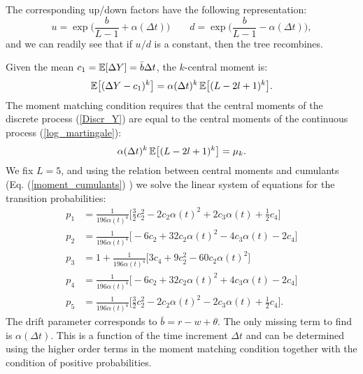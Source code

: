 The corresponding up/down factors have the following representation:
\begin{equation}\label{updown}
 u = \exp\biggl( \frac{b}{L-1} + \alpha(\Delta t) \biggr) \hspace{2em}  d = \exp\biggl( \frac{b}{L-1} - \alpha(\Delta t) \biggr),
\end{equation}
and we can readily see that if $u/d$ is a constant, then the tree recombines.

Given the mean $c_1 = \mathbb{E}[\Delta Y] = \bar b \Delta t$, the $k$-central moment is:
\begin{equation}\label{higher_moments}
 \mathbb{E} \bigl[ (\Delta Y - c_1)^k \bigr] = \alpha(\Delta t)^k\, \mathbb{E} \bigl[ (L-2l+1)^{k} \bigr].
\end{equation}
The moment matching condition requires that the central moments of the discrete process (\ref{Discr_Y}) 
are equal to the central moments
of the continuous process (\ref{log_martingale}):
\begin{equation}\label{moment_matching}
 \alpha(\Delta t)^k\, \mathbb{E} \bigl[ (L-2l+1)^{k} \bigr] = \mu_k.
\end{equation}
We fix $L=5$, and using the relation between central moments and cumulants (Eq. (\ref{moment_cumulants}) )
we solve the linear system of equations for the transition probabilities:
\begin{align}\label{probabilities1}
 p_1 &= \frac{1}{196 \alpha(t)^4} \biggl[ \frac{3}{2} c_2^2 -2 c_2\alpha(t)^2 + 2 c_3 \alpha(t) +\frac{1}{2} c_4  \biggr] \\ \nonumber
 p_2 &= \frac{1}{196 \alpha(t)^4} \biggl[ -6 c_2 + 32c_2 \alpha(t)^2 - 4c_3 \alpha(t) -2 c_4 \biggr] \\ \nonumber
 p_3 &=  1 + \frac{1}{196 \alpha(t)^4} \biggl[ 3c_4 + 9c_2^2 -60c_2 \alpha(t)^2   \biggr] \\ \nonumber
 p_4 &= \frac{1}{196 \alpha(t)^4} \biggl[ -6 c_2 + 32c_2 \alpha(t)^2 + 4c_3 \alpha(t) -2 c_4  \biggr] \\ \nonumber
 p_5 &= \frac{1}{196 \alpha(t)^4} \biggl[ \frac{3}{2} c_2^2 -2 c_2\alpha(t)^2 - 2 c_3 \alpha(t) +\frac{1}{2} c_4 \biggr].
\end{align}
The drift parameter corresponds to $\bar b = r - w + \theta$.
The only missing term to find is $\alpha(\Delta t)$. This is a function of the time increment $\Delta t$ and can be determined using the 
higher order terms in the moment matching condition together with the condition of positive probabilities.

